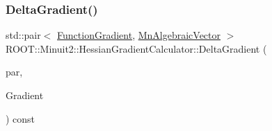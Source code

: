 \subsubsection{\texorpdfstring{DeltaGradient()}{DeltaGradient()}\hspace{0.1cm}{\footnotesize\ttfamily [1/2]}}
{\footnotesize\ttfamily std\+::pair$<$ \mbox{\hyperlink{classROOT_1_1Minuit2_1_1FunctionGradient}{Function\+Gradient}}, \mbox{\hyperlink{namespaceROOT_1_1Minuit2_a62ed97730a1ca8d3fbaec64a19aa11c9}{Mn\+Algebraic\+Vector}} $>$ R\+O\+O\+T\+::\+Minuit2\+::\+Hessian\+Gradient\+Calculator\+::\+Delta\+Gradient (\begin{DoxyParamCaption}\item[{const \mbox{\hyperlink{classROOT_1_1Minuit2_1_1MinimumParameters}{Minimum\+Parameters}} \&}]{par,  }\item[{const \mbox{\hyperlink{classROOT_1_1Minuit2_1_1FunctionGradient}{Function\+Gradient}} \&}]{Gradient }\end{DoxyParamCaption}) const}

